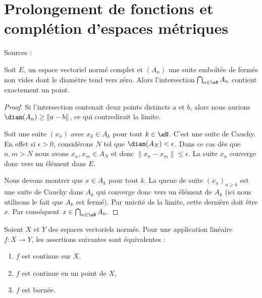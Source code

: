 
\section{Prolongement de fonctions et complétion d'espaces métriques}

Sources : \cite{RasclAnaFonc}

\begin{lemma}   \label{LemdCOMQM}
    Soit \( E\), un espace vectoriel normé complet et \( (A_n)\) une suite emboîtée de fermés non vides dont le diamètre tend vers zéro. Alors l'intersection \( \bigcap_{n\in \eN}A_n\) contient exactement un point.
\end{lemma}

\begin{proof}
    Si l'intersection contenait deux points distincts \( a\) et \( b\), alors nous aurions \( \diam(A_n)\geq\| a-b \|\), ce qui contredirait la limite.

    Soit une suite \( (x_n)\) avec \( x_k\in A_k\) pour tout \( k\in \eN\). C'est une suite de Cauchy. En effet si \( \epsilon>0\), considérons \( N\) tel que \( \diam(A_N)<\epsilon\). Dans ce cas dès que \( n,m>N\) nous avons \( x_n,x_m\in A_{N}\) et donc \( \| x_n-x_m \|\leq \epsilon\). La suite \( x_n\) converge donc vers un élément dans \( E\).

    Nous devons montrer que \( x\in A_k\) pour tout \( k\). La queue de suite \( (x_n)_{n\geq k}\) est une suite de Cauchy dans \( A_k\) qui converge donc vers un élément de \( A_k\) (ici nous utilisons le fait que \( A_k\) est fermé). Par unicité de la limite, cette dernière doit être \( x\). Par conséquent \( x\in\bigcap_{n\in \eN}A_n\).
\end{proof}

\begin{theorem}      \label{ThoCaMpKO}
    Soient \( X\) et \( Y\) des espaces vectoriels normés. Pour une application linéaire \( f\colon X\to Y\), les assertions suivantes sont équivalentes :
    \begin{enumerate}
        \item
            \( f\) est continue sur \( X\),
        \item
            \( f\) est continue en un point de \( X\),
        \item
            \( f\) est bornée.
    \end{enumerate}
\end{theorem}

